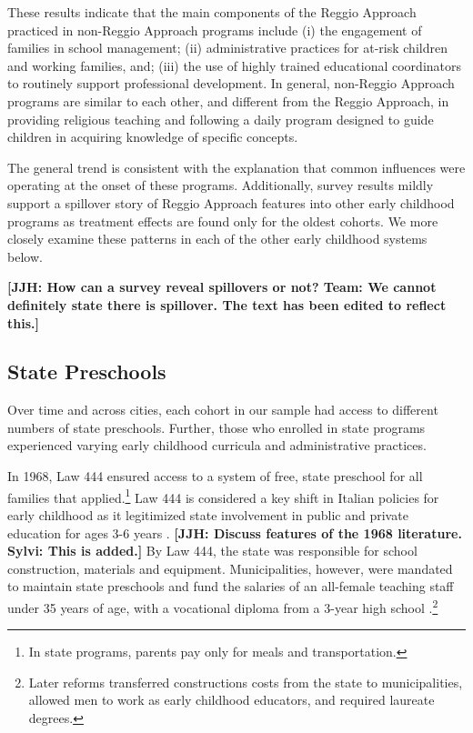 These results indicate that the main components of the Reggio Approach practiced in non-Reggio Approach programs include (i) the engagement of families in school management; (ii) administrative practices for at-risk children and working families, and; (iii) the use of highly trained educational coordinators to routinely support professional development. In general, non-Reggio Approach programs are similar to each other, and different from the Reggio Approach, in providing religious teaching and following a daily program designed to guide children in acquiring knowledge of specific concepts. 

The general trend is consistent with the explanation that common influences were operating at the onset of these programs. Additionally, survey results mildly support a spillover story of Reggio Approach features into other early childhood programs as treatment effects are found only for the oldest cohorts. We more closely examine these patterns in each of the other early childhood systems below. 

\textbf{[JJH: How can a survey reveal spillovers or not? Team: We cannot definitely state there is spillover. The text has been edited to reflect this.]} 

\subsection{State Preschools}

Over time and across cities, each cohort in our sample had access to different numbers of state preschools. Further, those who enrolled in state programs experienced varying early childhood curricula and administrative practices.

In 1968, Law 444 ensured access to a system of free, state preschool for all families that applied.\footnote{In state programs, parents pay only for meals and transportation.} Law 444 is considered a key shift in Italian policies for early childhood as it legitimized state involvement in public and private education for ages 3-6 years \citep{Hohnerlein_2009_Paradox-Public-Preschools}. \textbf{[JJH: Discuss features of the 1968 literature. Sylvi: This is added.]} By Law 444, the state was responsible for school construction, materials and equipment. Municipalities, however, were mandated to maintain state preschools and fund the salaries of an all-female teaching staff under 35 years of age, with a vocational diploma from a 3-year high school \citep{OECD_2001_Italy-Country-Note}.\footnote{Later reforms transferred constructions costs from the state to municipalities, allowed men to work as early childhood educators, and required laureate degrees.} 

